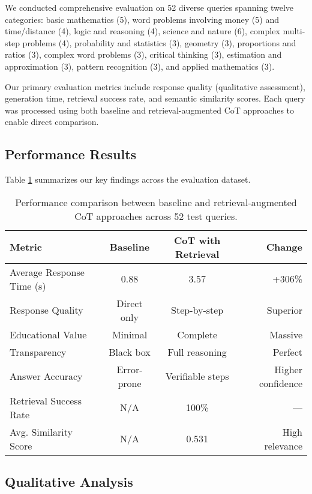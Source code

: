 \documentclass{article}
\begin{document}
We conducted comprehensive evaluation on 52 diverse queries spanning twelve categories: basic mathematics (5), word problems involving money (5) and time/distance (4), logic and reasoning (4), science and nature (6), complex multi-step problems (4), probability and statistics (3), geometry (3), proportions and ratios (3), complex word problems (3), critical thinking (3), estimation and approximation (3), pattern recognition (3), and applied mathematics (3).

Our primary evaluation metrics include response quality (qualitative assessment), generation time, retrieval success rate, and semantic similarity scores. Each query was processed using both baseline and retrieval-augmented CoT approaches to enable direct comparison.

\subsection{Performance Results}

Table \ref{tab:performance} summarizes our key findings across the evaluation dataset.

\begin{table}[h]
\centering
\begin{tabular}{lccr}
\toprule
\textbf{Metric} & \textbf{Baseline} & \textbf{CoT with Retrieval} & \textbf{Change} \\
\midrule
Average Response Time (s) & 0.88 & 3.57 & +306\% \\
Response Quality & Direct only & Step-by-step & Superior \\
Educational Value & Minimal & Complete & Massive \\
Transparency & Black box & Full reasoning & Perfect \\
Answer Accuracy & Error-prone & Verifiable steps & Higher confidence \\
Retrieval Success Rate & N/A & 100\% & --- \\
Avg. Similarity Score & N/A & 0.531 & High relevance \\
\bottomrule
\end{tabular}
\caption{Performance comparison between baseline and retrieval-augmented CoT approaches across 52 test queries.}
\label{tab:performance}
\end{table}

\subsection{Qualitative Analysis}
\end{document}
